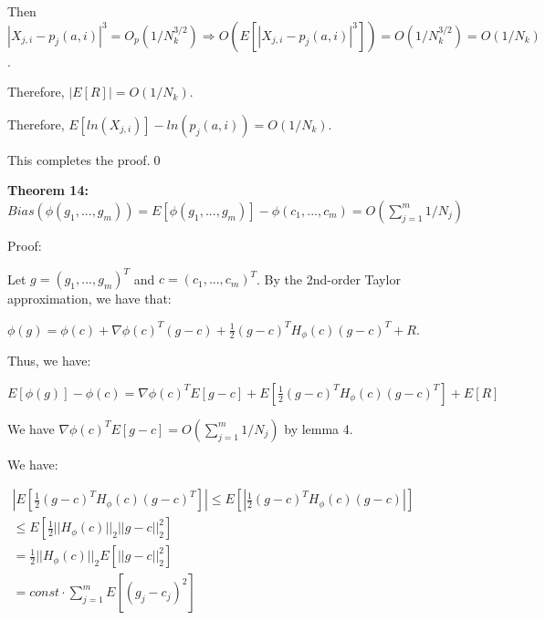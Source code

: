\documentclass{article}
\begin{document}
Then $\displaystyle |X_{j,i} -p_{j}\left( a,i\right) |^{3} =O_{p}\left( 1/N_{k}^{3/2}\right) \Longrightarrow O\left( E\left[ |X_{j,i} -p_{j}\left( a,i\right) |^{3}\right]\right) =O\left( 1/N_{k}^{3/2}\right) =O\left( 1/N_{k}\right)$.

Therefore, $\displaystyle |E\left[ R\right] |=O\left( 1/N_{k}\right)$.

Therefore, $\displaystyle E\left[ ln\left( X_{j,i}\right)\right] -ln\left( p_{j}\left( a,i\right)\right) =O\left( 1/N_{k}\right)$.

This completes the proof.\qed 

\textbf{Theorem 14: }$\displaystyle Bias\left( \phi \left( g_{1} ,...,g_{m}\right)\right) =E\left[ \phi \left( g_{1} ,...,g_{m}\right)\right] -\phi \left( c_{1} ,...,c_{m}\right) =O\left(\sum _{j=1}^{m} 1/N_{j}\right)$

Proof:

Let $\displaystyle g=\left( g_{1} ,...,g_{m}\right)^{T}$ and $\displaystyle c=\left( c_{1} ,...,c_{m}\right)^{T}$. By the 2nd-order Taylor approximation, we have that:

$\displaystyle \phi \left( g\right) =\phi \left( c\right) +\nabla \phi \left( c\right)^{T}\left( g-c\right) +\frac{1}{2}\left( g-c\right)^{T} H_{\phi }\left( c\right)\left( g-c\right)^{T} +R$.

Thus, we have:

$\displaystyle E\left[ \phi \left( g\right)\right] -\phi \left( c\right) =\nabla \phi \left( c\right)^{T} E\left[ g-c\right] +E\left[\frac{1}{2}\left( g-c\right)^{T} H_{\phi }\left( c\right)\left( g-c\right)^{T}\right] +E\left[ R\right]$

We have $\displaystyle \nabla \phi \left( c\right)^{T} E\left[ g-c\right] =O\left(\sum _{j=1}^{m} 1/N_{j}\right)$ by lemma 4.

We have:

$\displaystyle  \begin{array}{l}
|E\left[\frac{1}{2}\left( g-c\right)^{T} H_{\phi }\left( c\right)\left( g-c\right)^{T}\right] |\leqslant E\left[ |\frac{1}{2}\left( g-c\right)^{T} H_{\phi }\left( c\right)\left( g-c\right) |\right]\\
\leqslant E\left[\frac{1}{2} ||H_{\phi }\left( c\right) ||_{2} ||g-c||_{2}^{2}\right]\\
=\frac{1}{2} ||H_{\phi }\left( c\right) ||_{2} E\left[ ||g-c||_{2}^{2}\right]\\
=const\cdot \sum _{j=1}^{m} E\left[\left( g_{j} -c_{j}\right)^{2}\right]
\end{array}$
\end{document}
